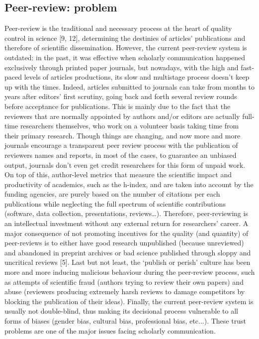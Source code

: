 \documentclass[runningheads]{llncs}
\begin{document}
\subsection{Peer-review: problem}
Peer-review is the traditional and necessary process at the heart of quality control in science [9, 12], determining the destinies of articles’ publications and therefore of scientific dissemination. However, the current peer-review system is outdated: in the past, it was effective when scholarly communication happened exclusively through printed paper journals, but nowadays, with the high and fast-paced levels of articles productions, its slow and multistage process doesn’t keep up with the times. Indeed, articles submitted to journals can take from months to years after editors’ first scrutiny, going back and forth several review rounds before acceptance for publications. This is mainly due to the fact that the reviewers that are normally appointed by authors and/or editors are actually full-time researchers themselves, who work on a volunteer basis taking time from their primary research. Though things are changing, and now more and more journals encourage a transparent peer review process with the publication of reviewers names and reports, in most of the cases, to guarantee an unbiased output, journals don’t even get credit researchers for this form of unpaid work. On top of this, author-level metrics that measure the scientific impact and productivity of academics, such as the h-index, and are taken into account by the funding agencies, are purely based on the number of citations per each publications while neglecting the full spectrum of scientific contributions (software, data collection, presentations, reviews…). Therefore, peer-reviewing is an intellectual investment without any external return for researchers’ career. A major consequence of not promoting incentives for the quality (and quantity) of peer-reviews is to either have good research unpublished (because unreviewed) and abandoned in preprint archives or bad science published through sloppy and uncritical reviews [5]. Last but not least, the ‘publish or perish’ culture has been more and more inducing malicious behaviour during the peer-review process, such as attempts of scientific fraud (authors trying to review their own papers) and abuse (reviewers producing extremely harsh reviews to damage competitors by blocking the publication of their ideas). Finally, the current peer-review system is usually not double-blind, thus making its decisional process vulnerable to all forms of biases (gender bias, cultural bias, professional bias, etc...). These trust problems are one of the major issues facing scholarly communication.
\end{document}

